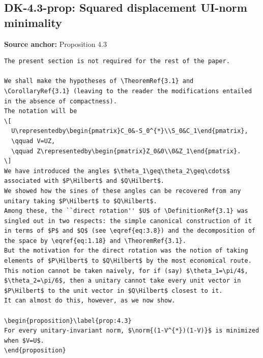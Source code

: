 \subsection*{DK-4.3-prop: Squared displacement UI-norm minimality}
\noindent\textbf{Source anchor:} Proposition 4.3\\
\begin{verbatim}
The present section is not required for the rest of the paper.

We shall make the hypotheses of \TheoremRef{3.1} and \CorollaryRef{3.1} (leaving to the reader the modifications entailed in the absence of compactness).
The notation will be
\[
  U\representedby\begin{pmatrix}C_0&-S_0^{*}\\S_0&C_1\end{pmatrix},
  \qquad V=UZ,
  \qquad Z\representedby\begin{pmatrix}Z_0&0\\0&Z_1\end{pmatrix}.
\]
We have introduced the angles $\theta_1\geq\theta_2\geq\cdots$ associated with $P\Hilbert$ and $Q\Hilbert$.
We showed how the sines of these angles can be recovered from any unitary taking $P\Hilbert$ to $Q\Hilbert$.
Among these, the ``direct rotation'' $U$ of \DefinitionRef{3.1} was singled out in two respects: the simple canonical construction of it in terms of $P$ and $Q$ (see \eqref{eq:3.8}) and the decomposition of the space by \eqref{eq:1.18} and \TheoremRef{3.1}.
But the motivation for the direct rotation was the notion of taking elements of $P\Hilbert$ to $Q\Hilbert$ by the most economical route.
This notion cannot be taken naively, for if (say) $\theta_1=\pi/4$, $\theta_2=\pi/6$, then a unitary cannot take every unit vector in $P\Hilbert$ to the unit vector in $Q\Hilbert$ closest to it.
It can almost do this, however, as we now show.

\begin{proposition}\label{prop:4.3}
For every unitary-invariant norm, $\norm{(1-V^{*})(1-V)}$ is minimized when $V=U$.
\end{proposition}
\end{verbatim}

